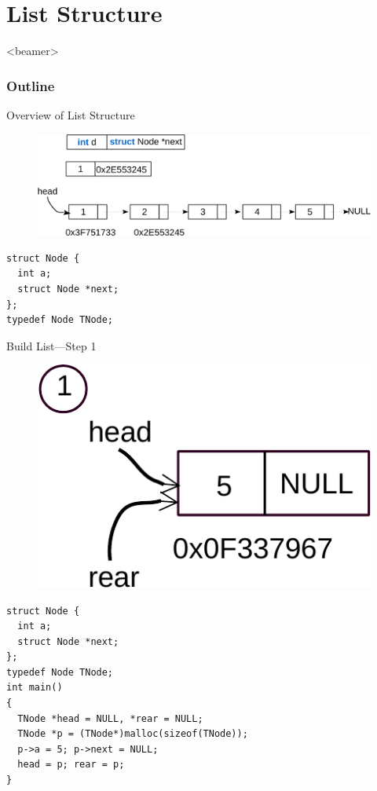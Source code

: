 \section{List Structure}
\label{sec:list}
\begin{frame}<beamer>
    \frametitle{Outline}
    \tableofcontents[currentsection]
\end{frame}

\begin{frame}[fragile]{Overview of List Structure}
\vspace{0.1in}
\begin{figure}
	\includegraphics[width=0.8\linewidth]{figs/list.pdf}
\end{figure}
\begin{lstlisting}[xleftmargin=0.32\linewidth, linewidth=0.6\linewidth]
struct Node {
  int a;
  struct Node *next;
};
typedef Node TNode;
\end{lstlisting}
\end{frame}

\begin{frame}[fragile]{Build List---Step 1}
\begin{figure}
\begin{center}
	\includegraphics[width=0.25\linewidth]{figs/list_build_step1.pdf}
\end{center}
\end{figure}
\begin{lstlisting}[xleftmargin=0.05\linewidth, linewidth=0.9\linewidth]
struct Node {
  int a;
  struct Node *next;
};
typedef Node TNode;
int main()
{
  TNode *head = NULL, *rear = NULL;
  TNode *p = (TNode*)malloc(sizeof(TNode));
  p->a = 5; p->next = NULL;
  head = p; rear = p;
}
\end{lstlisting}
\end{frame}

